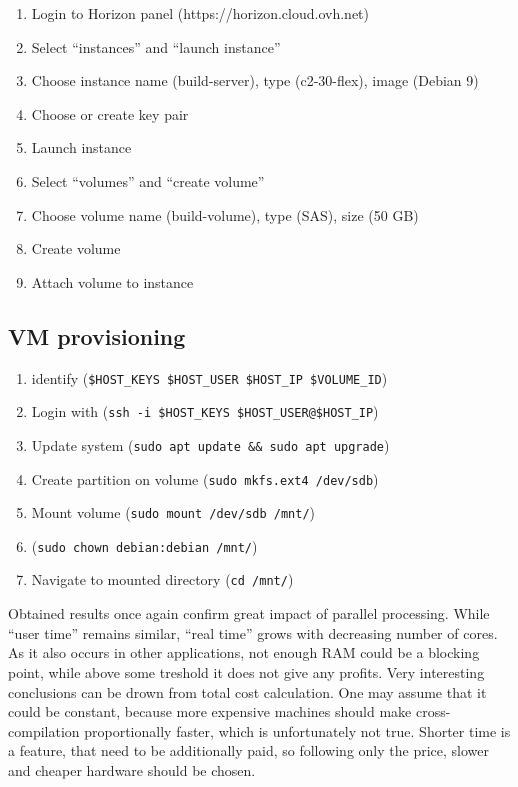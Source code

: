 \documentclass[printmode]{mgr}
\begin{document}
\begin{enumerate}
  \item Login to Horizon panel (https://horizon.cloud.ovh.net)
  \item Select ``instances'' and ``launch instance''
  \item Choose instance name (build-server), type (c2-30-flex), image (Debian 9)
  \item Choose or create key pair
  \item Launch instance
  \item Select ``volumes'' and ``create volume'' %
  \item Choose volume name (build-volume), type (SAS), size (50 GB)
  \item Create volume
  \item Attach volume to instance
\end{enumerate}

\subsection*{VM provisioning}

\begin{enumerate}
  \item identify (\verb|$HOST_KEYS $HOST_USER $HOST_IP $VOLUME_ID|)
  \item Login with (\verb|ssh -i $HOST_KEYS $HOST_USER@$HOST_IP|)
  \item Update system (\verb|sudo apt update && sudo apt upgrade|)
  \item Create partition on volume (\verb|sudo mkfs.ext4 /dev/sdb|)
  \item Mount volume (\verb|sudo mount /dev/sdb /mnt/|)
  \item (\verb|sudo chown debian:debian /mnt/|)
  \item Navigate to mounted directory (\verb|cd /mnt/|)
\end{enumerate}

Obtained results once again confirm great impact of parallel processing.
While ``user time'' remains similar, ``real time'' grows with decreasing number of cores.
As it also occurs in other applications, not enough RAM could be a blocking point, while above some treshold it does not give any profits.
Very interesting conclusions can be drown from total cost calculation.
One may assume that it could be constant, because more expensive machines should make cross-compilation proportionally faster, which is unfortunately not true.
Shorter time is a feature, that need to be additionally paid, so following only the price, slower and cheaper hardware should be chosen.
\end{document}
